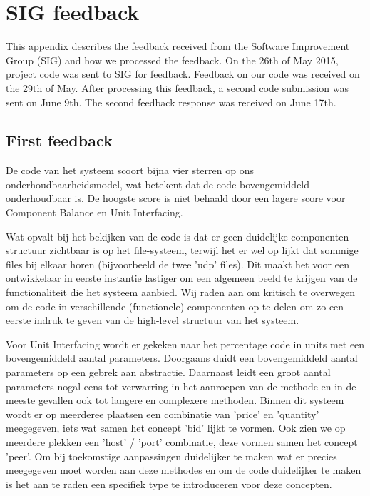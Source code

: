 \section{SIG feedback}

This appendix describes the feedback received from the Software Improvement Group (SIG) and how we processed the feedback.
On the 26th of May 2015, project code was sent to SIG for feedback.
Feedback on our code was received on the 29th of May.
After processing this feedback, a second code submission was sent on June 9th.
The second feedback response was received on June 17th.

\subsection{First feedback}

De code van het systeem scoort bijna vier sterren op ons onderhoudbaarheidsmodel, wat betekent dat de code bovengemiddeld onderhoudbaar is.
De hoogste score is niet behaald door een lagere score voor Component Balance en Unit Interfacing.


Wat opvalt bij het bekijken van de code is dat er geen duidelijke componenten-structuur zichtbaar is op het file-systeem, terwijl het er wel op lijkt dat sommige files bij elkaar horen (bijvoorbeeld de twee 'udp' files).
Dit maakt het voor een ontwikkelaar in eerste instantie lastiger om een algemeen beeld te krijgen van de functionaliteit die het systeem aanbied.
Wij raden aan om kritisch te overwegen om de code in verschillende (functionele) componenten op te delen om zo een eerste indruk te geven van de high-level structuur van het systeem.


Voor Unit Interfacing wordt er gekeken naar het percentage code in units met een bovengemiddeld aantal parameters.
Doorgaans duidt een bovengemiddeld aantal parameters op een gebrek aan abstractie.
Daarnaast leidt een groot aantal parameters nogal eens tot verwarring in het aanroepen van de methode en in de meeste gevallen ook tot langere en complexere methoden.
Binnen dit systeem wordt er op meerderee plaatsen een combinatie van 'price' en 'quantity' meegegeven, iets wat samen het concept 'bid' lijkt te vormen.
Ook zien we op meerdere plekken een 'host' / 'port' combinatie, deze vormen samen het concept 'peer'.
Om bij toekomstige aanpassingen duidelijker te maken wat er precies meegegeven moet worden aan deze methodes en om de code duidelijker te maken is het aan te raden een specifiek type te introduceren voor deze concepten.


